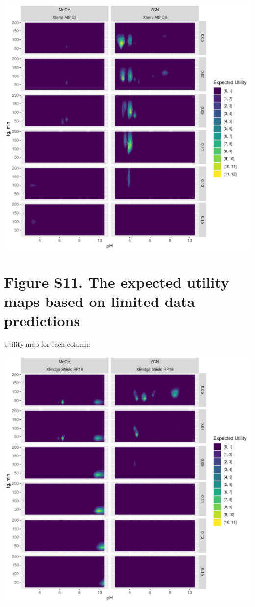 \documentclass[
]{article}
\begin{document}
\newpage{}

\includegraphics{../figures/casestudy1/utilitymap/utilitymap5.pdf}

\newpage{}

\hypertarget{figure-s11.-the-expected-utility-maps-based-on-limited-data-predictions}{%
\section{Figure S11. The expected utility maps based on limited data
predictions}\label{figure-s11.-the-expected-utility-maps-based-on-limited-data-predictions}}

Utility map for each column:

\includegraphics{../figures/casestudy2/utilitymap/utilitymap1.pdf}
\end{document}
